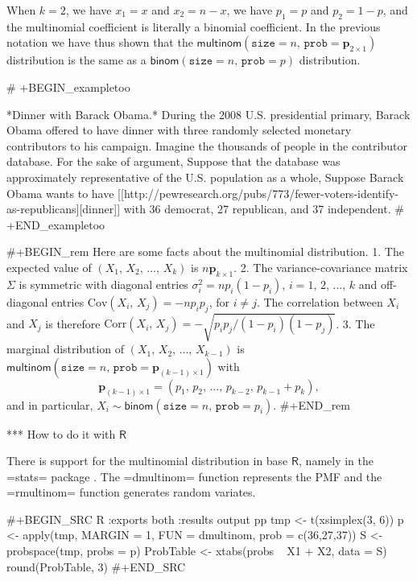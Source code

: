 When \(k=2\), we have \(x_{1}=x\) and \(x_{2}=n-x\), we have
\(p_{1}=p\) and \(p_{2}=1-p\), and the multinomial coefficient is
literally a binomial coefficient. In the previous notation we have
thus shown that the
\(\mathsf{multinom}(\mathtt{size}=n,\,\mathtt{prob}=\mathbf{p}_{2\times1})\)
distribution is the same as a
\(\mathsf{binom}(\mathtt{size}=n,\,\mathtt{prob}=p)\) distribution.

# +BEGIN_exampletoo

*Dinner with Barack Obama.* During the 2008 U.S. presidential primary,
Barack Obama offered to have dinner with three randomly selected
monetary contributors to his campaign. Imagine the thousands of people
in the contributor database. For the sake of argument, Suppose that
the database was approximately representative of the U.S. population
as a whole, Suppose Barack Obama wants to have [[http://pewresearch.org/pubs/773/fewer-voters-identify-as-republicans][dinner]] with 36
democrat, 27 republican, and 37 independent.
# +END_exampletoo


#+BEGIN_rem
Here are some facts about the multinomial distribution.
1. The expected value of \((X_{1},\, X_{2},\,\ldots,\, X_{k})\) is
   \(n\mathbf{p}_{k\times1}\).
2. The variance-covariance matrix \(\Sigma\) is symmetric with
   diagonal entries \(\sigma_{i}^{2}=np_{i}(1-p_{i})\),
   \(i=1,\,2,\,\ldots,\, k\) and off-diagonal entries
   \(\mbox{Cov}(X_{i},\, X_{j})=-np_{i}p_{j}\), for \(i\neq j\). The
   correlation between \(X_{i}\) and \(X_{j}\) is therefore
   \(\mbox{Corr}(X_{i},\,
   X_{j})=-\sqrt{p_{i}p_{j}/(1-p_{i})(1-p_{j})}\).
3. The marginal distribution of \((X_{1},\, X_{2},\,\ldots,\,
   X_{k-1})\) is
   \(\mathsf{multinom}(\mathtt{size}=n,\,\mathtt{prob}=\mathbf{p}_{(k-1)\times1})\)
   with
   \begin{equation}
   \mathbf{p}_{(k-1)\times1}=\left(p_{1},\, p_{2},\,\ldots,\, p_{k-2},\, p_{k-1}+p_{k}\right),
   \end{equation}
   and in particular,
   \(X_{i}\sim\mathsf{binom}(\mathtt{size}=n,\,\mathtt{prob}=p_{i})\).
#+END_rem

*** How to do it with \(\mathsf{R}\)

There is support for the multinomial distribution in base
\(\mathsf{R}\), namely in the =stats= package \cite{stats}. The
=dmultinom= function represents the PMF and the =rmultinom= function
generates random variates.

#+BEGIN_SRC R :exports both :results output pp 
tmp <- t(xsimplex(3, 6))
p <- apply(tmp, MARGIN = 1, FUN = dmultinom, prob = c(36,27,37))
S <- probspace(tmp, probs = p)
ProbTable <- xtabs(probs ~ X1 + X2, data = S)
round(ProbTable, 3)
#+END_SRC

